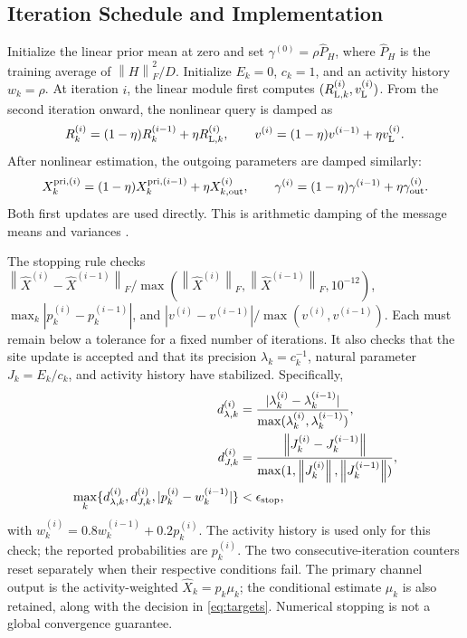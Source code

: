 \documentclass[10pt,a4paper]{article}
\newcommand{\norm}[1]{\left\lVert#1\right\rVert}
\begin{document}
\subsection{Iteration Schedule and Implementation}
\label{sec:schedule}

Initialize the linear prior mean at zero and set
$\gamma^{(0)}=\rho\widehat P_H$, where
$\widehat P_H$ is the training average of $\norm{H}_F^2/D$.
Initialize $E_k=0$, $c_k=1$, and an activity history $w_k=\rho$.
At iteration $i$, the linear module first computes
$(R_{{\rm L},k}^{(i)},v_{\rm L}^{(i)})$. From the second iteration onward,
the nonlinear query is damped as
\begin{equation}
 R_k^{(i)}=(1-\eta)R_k^{(i-1)}+\eta R_{{\rm L},k}^{(i)},\qquad
 v^{(i)}=(1-\eta)v^{(i-1)}+\eta v_{\rm L}^{(i)}.
 \label{eq:input-damping}
\end{equation}
After nonlinear estimation, the outgoing parameters are damped similarly:
\begin{equation}
 X_k^{{\rm pri},(i)}=(1-\eta)X_k^{{\rm pri},(i-1)}+\eta X_{k,\rm out}^{(i)},
 \qquad
 \gamma^{(i)}=(1-\eta)\gamma^{(i-1)}+\eta\gamma_{\rm out}^{(i)}.
 \label{eq:output-damping}
\end{equation}
Both first updates are used directly. This is arithmetic damping of the
message means and variances \cite[Sec.~V-B1]{cai2026}.

The stopping rule checks
$\norm{\widehat X^{(i)}-\widehat X^{(i-1)}}_F/
\max(\norm{\widehat X^{(i)}}_F,\norm{\widehat X^{(i-1)}}_F,10^{-12})$,
$\max_k|p_k^{(i)}-p_k^{(i-1)}|$, and
$|v^{(i)}-v^{(i-1)}|/\max(v^{(i)},v^{(i-1)})$.
Each must remain below a tolerance for a fixed number of iterations.
It also checks that the site update is accepted and that its precision
$\lambda_k=c_k^{-1}$, natural parameter $J_k=E_k/c_k$, and activity
history have stabilized. Specifically,
\begin{align}
 d_{\lambda,k}^{(i)}&=
 \frac{|\lambda_k^{(i)}-\lambda_k^{(i-1)}|}
      {\max(\lambda_k^{(i)},\lambda_k^{(i-1)})},\notag\\
 d_{J,k}^{(i)}&=
 \frac{\norm{J_k^{(i)}-J_k^{(i-1)}}}
      {\max(1,\norm{J_k^{(i)}},\norm{J_k^{(i-1)}})},\notag\\
 \max_k\{d_{\lambda,k}^{(i)},d_{J,k}^{(i)},
         |p_k^{(i)}-w_k^{(i-1)}|\}&<\epsilon_{\rm stop},
 \label{eq:site-stopping}
\end{align}
with $w_k^{(i)}=0.8w_k^{(i-1)}+0.2p_k^{(i)}$. The activity history is
used only for this check; the reported probabilities are $p_k^{(i)}$.
The two consecutive-iteration counters reset separately when their
respective conditions fail. The primary channel output is the
activity-weighted $\widehat X_k=p_k\mu_k$; the conditional estimate
$\mu_k$ is also retained, along with the decision in \eqref{eq:targets}.
Numerical stopping is not a global convergence guarantee.
\end{document}
